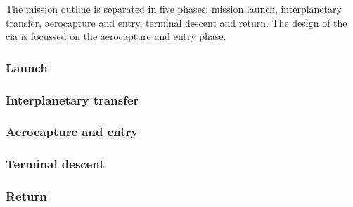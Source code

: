 The mission outline is separated in five phases: mission launch, interplanetary transfer, aerocapture and entry, terminal descent and return. The design of the \gls{cia} is focussed on the aerocapture and entry phase. %

\subsubsection{Launch} \label{sec:launch}


\subsubsection{Interplanetary transfer} \label{sec:interplanetary}


\subsubsection{Aerocapture and entry} \label{sec:entry}


\subsubsection{Terminal descent} \label{sec:terminal}


%

\subsubsection{Return} \label{sec:return}






